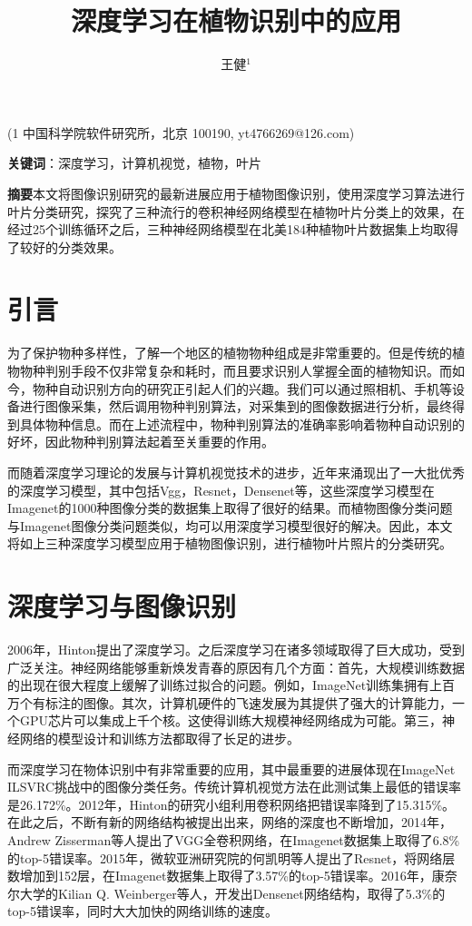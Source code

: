 \documentclass[a4paper]{ctexart} %
\title{深度学习在植物识别中的应用}
\author{王健$^1$}
\begin{document}
	\maketitle
	\begin{center}
		(1 中国科学院软件研究所，北京 100190, yt4766269@126.com)
	\end{center}
\begin{center}
	\textbf{关键词}：深度学习，计算机视觉，植物，叶片
\end{center}


\textbf{摘要}\quad 本文将图像识别研究的最新进展应用于植物图像识别，使用深度学习算法进行叶片分类研究，探究了三种流行的卷积神经网络模型在植物叶片分类上的效果，在经过25个训练循环之后，三种神经网络模型在北美184种植物叶片数据集上均取得了较好的分类效果。

\section*{引言}
为了保护物种多样性，了解一个地区的植物物种组成是非常重要的。但是传统的植物物种判别手段不仅非常复杂和耗时，而且要求识别人掌握全面的植物知识。而如今，物种自动识别方向的研究正引起人们的兴趣。我们可以通过照相机、手机等设备进行图像采集，然后调用物种判别算法，对采集到的图像数据进行分析，最终得到具体物种信息。而在上述流程中，物种判别算法的准确率影响着物种自动识别的好坏，因此物种判别算法起着至关重要的作用。

而随着深度学习理论的发展与计算机视觉技术的进步，近年来涌现出了一大批优秀的深度学习模型，其中包括Vgg\parencite{vgg}，Resnet\parencite{resnet}，Densenet\parencite{densenet}等，这些深度学习模型在Imagenet\parencite{imagenet}的1000种图像分类的数据集上取得了很好的结果。而植物图像分类问题与Imagenet图像分类问题类似，均可以用深度学习模型很好的解决。因此，本文将如上三种深度学习模型应用于植物图像识别，进行植物叶片照片的分类研究。

\section*{深度学习与图像识别}
2006年，Hinton提出了深度学习。之后深度学习在诸多领域取得了巨大成功，受到广泛关注。神经网络能够重新焕发青春的原因有几个方面：首先，大规模训练数据的出现在很大程度上缓解了训练过拟合的问题。例如，ImageNet训练集拥有上百万个有标注的图像。其次，计算机硬件的飞速发展为其提供了强大的计算能力，一个GPU芯片可以集成上千个核。这使得训练大规模神经网络成为可能。第三，神经网络的模型设计和训练方法都取得了长足的进步。

而深度学习在物体识别中有非常重要的应用，其中最重要的进展体现在ImageNet ILSVRC挑战中的图像分类任务。传统计算机视觉方法在此测试集上最低的错误率是26.172\%。2012年，Hinton的研究小组利用卷积网络把错误率降到了15.315\%。在此之后，不断有新的网络结构被提出出来，网络的深度也不断增加，2014年，Andrew Zisserman等人提出了VGG全卷积网络，在Imagenet数据集上取得了6.8\%的top-5错误率。2015年，微软亚洲研究院的何凯明等人提出了Resnet，将网络层数增加到152层，在Imagenet数据集上取得了3.57\%的top-5错误率。2016年，康奈尔大学的Kilian Q. Weinberger等人，开发出Densenet网络结构，取得了5.3\%的top-5错误率，同时大大加快的网络训练的速度。
\end{document}

